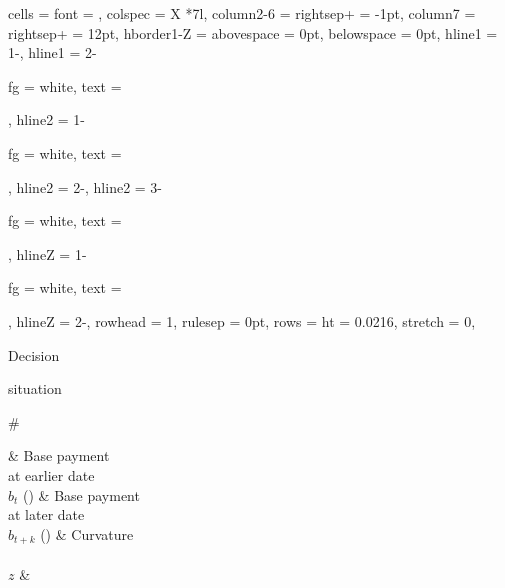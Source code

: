 \begin{appendix}
\begin{booktabs}[
	caption = {Parameter values used in the time experiment},
	label = {tab:parameter_values_time},
	footsep = 2\belowbottomsep,
	long,
	presep = \smallskipamount,  %
	postsep = \medskipamount,  %
	remark{Note} = {Taken from \url{https://www.econtribute.de/RePEc/ajk/ajkdps/ECONtribute_336_2024.pdf}.},
]{
	cells = {font = \footnotesize},
	colspec = {X *{7}{l}},
	column{2-6} = {rightsep+ = -1pt},
	column{7} = {rightsep+ = 12pt},
	hborder{1-Z} = {abovespace = 0pt, belowspace = 0pt},
	hline{1} = {1}{-}{\heavyrulewidth},
	hline{1} = {2}{-}{fg = white, text = {\rule{0pt}{\belowrulesep}}},
	hline{2} = {1}{-}{fg = white, text = {\rule{0pt}{\aboverulesep}}},
	hline{2} = {2}{-}{\lightrulewidth},
	hline{2} = {3}{-}{fg = white, text = {\rule{0pt}{\belowrulesep}}},
	hline{Z} = {1}{-}{fg = white, text = {\rule{0pt}{\aboverulesep}}},
	hline{Z} = {2}{-}{\heavyrulewidth},
	rowhead = 1,  %
	rulesep = 0pt,
	rows = {ht = 0.0216\textheight},
	stretch = 0,  %
}
	{\strut Decision \\ \strut situation \\ \strut \#} &
	{Base payment \\ at earlier date \\ $b_t$ (\texteuro)} &
	{Base payment \\ at later date \\ $b_{t+k}$ (\texteuro)} &
	{Curvature \\ ~ \\ $z$} &

\end{booktabs}
\end{appendix}
